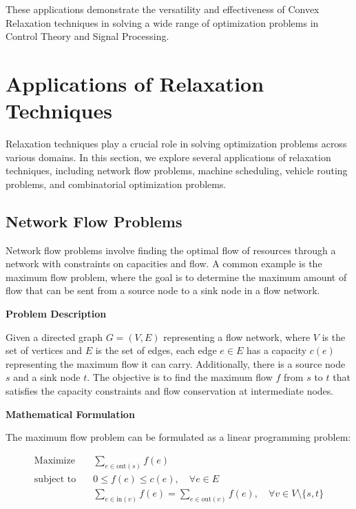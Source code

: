 \documentclass[12pt]{book} %
\begin{document}
These applications demonstrate the versatility and effectiveness of Convex Relaxation techniques in solving a wide range of optimization problems in Control Theory and Signal Processing.


\section{Applications of Relaxation Techniques}

Relaxation techniques play a crucial role in solving optimization problems across various domains. In this section, we explore several applications of relaxation techniques, including network flow problems, machine scheduling, vehicle routing problems, and combinatorial optimization problems.

\subsection{Network Flow Problems}

Network flow problems involve finding the optimal flow of resources through a network with constraints on capacities and flow. A common example is the maximum flow problem, where the goal is to determine the maximum amount of flow that can be sent from a source node to a sink node in a flow network.

\textbf{Problem Description}

Given a directed graph \(G = (V, E)\) representing a flow network, where \(V\) is the set of vertices and \(E\) is the set of edges, each edge \(e \in E\) has a capacity \(c(e)\) representing the maximum flow it can carry. Additionally, there is a source node \(s\) and a sink node \(t\). The objective is to find the maximum flow \(f\) from \(s\) to \(t\) that satisfies the capacity constraints and flow conservation at intermediate nodes.

\textbf{Mathematical Formulation}

The maximum flow problem can be formulated as a linear programming problem:

\[
\begin{aligned}
\text{Maximize} \quad & \sum_{e \in \text{out}(s)} f(e) \\
\text{subject to} \quad & 0 \leq f(e) \leq c(e), \quad \forall e \in E \\
& \sum_{e \in \text{in}(v)} f(e) = \sum_{e \in \text{out}(v)} f(e), \quad \forall v \in V \setminus \{s, t\}
\end{aligned}
\]
\end{document}
